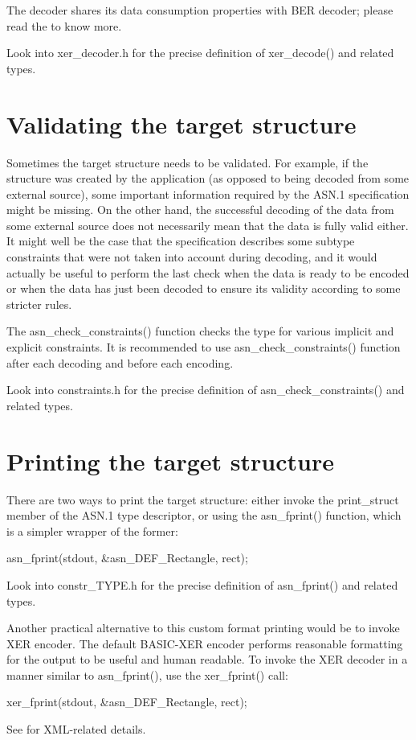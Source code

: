 \documentclass[english,oneside,12pt]{book}
\begin{document}
The decoder shares its data consumption properties with BER decoder;
please read the  to know more.

Look into xer\_decoder.h for the precise definition of xer\_decode()
and related types.


\section{\label{sec:Validating-the-target}Validating the target structure}

Sometimes the target structure needs to be validated. For example,
if the structure was created by the application (as opposed to being
decoded from some external source), some important information required
by the ASN.1 specification might be missing. On the other hand, the
successful decoding of the data from some external source does not
necessarily mean that the data is fully valid either. It might well
be the case that the specification describes some subtype constraints
that were not taken into account during decoding, and it would actually
be useful to perform the last check when the data is ready to be encoded
or when the data has just been decoded to ensure its validity according
to some stricter rules.

The asn\_check\_constraints() function checks the type for various
implicit and explicit constraints. It is recommended to use asn\_check\_constraints()
function after each decoding and before each encoding.

Look into constraints.h for the precise definition of asn\_check\_constraints()
and related types.


\section{\label{sec:Printing-the-target}Printing the target structure}

There are two ways to print the target structure: either invoke the
print\_struct member of the ASN.1 type descriptor, or using the asn\_fprint()
function, which is a simpler wrapper of the former:
\begin{codesample}
asn_fprint(stdout, &asn_DEF_Rectangle, rect);
\end{codesample}
Look into constr\_TYPE.h for the precise definition of asn\_fprint()
and related types.

Another practical alternative to this custom format printing would
be to invoke XER encoder. The default BASIC-XER encoder performs reasonable
formatting for the output to be useful and human readable. To invoke
the XER decoder in a manner similar to asn\_fprint(), use the xer\_fprint()
call:
\begin{codesample}
xer_fprint(stdout, &asn_DEF_Rectangle, rect);
\end{codesample}
See  for XML-related details.
\end{document}
